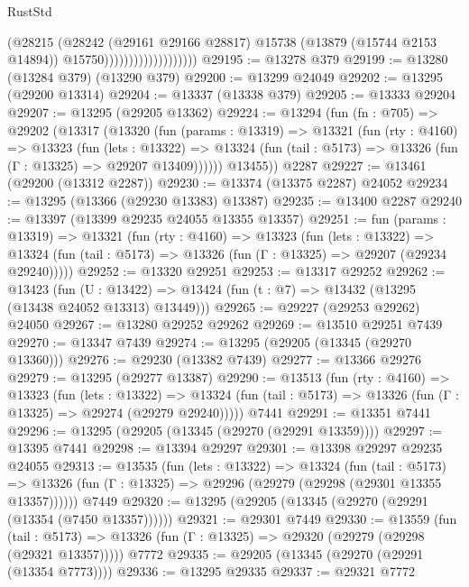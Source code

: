\begin{lexlean}{RustStd}
\begin{coremodule}
                                      (@28215
                                        (@28242
                                          (@29161 @29166 @28817)
                                          @15738
                                          (@13879 (@15744 @2153 @14894))
                                          @15750)))))))))))))))))))
@29195 := @13278 @379
@29199 := @13280 (@13284 @379) (@13290 @379)
@29200 := @13299 @24049
@29202 := @13295 (@29200 @13314)
@29204 := @13337 (@13338 @379)
@29205 := @13333 @29204
@29207 := @13295 (@29205 @13362)
@29224 := @13294
    (fun (fn : @705) =>
    @29202
      (@13317
        (@13320
          (fun (params : @13319) =>
          @13321
            (fun (rty : @4160) =>
            @13323
              (fun (lets : @13322) =>
              @13324 (fun (tail : @5173) => @13326 (fun (Γ : @13325) => @29207 @13409))))))
        @13455))
    @2287
@29227 := @13461 (@29200 (@13312 @2287))
@29230 := @13374 (@13375 @2287) @24052
@29234 := @13295 (@13366 (@29230 @13383) @13387)
@29235 := @13400 @2287
@29240 := @13397 (@13399 @29235 @24055 @13355 @13357)
@29251 := fun (params : @13319) =>
  @13321
    (fun (rty : @4160) =>
    @13323
      (fun (lets : @13322) =>
      @13324 (fun (tail : @5173) => @13326 (fun (Γ : @13325) => @29207 (@29234 @29240)))))
@29252 := @13320 @29251
@29253 := @13317 @29252
@29262 := @13423
    (fun (U : @13422) => @13424 (fun (t : @7) => @13432 (@13295 (@13438 @24052 @13313) @13449)))
@29265 := @29227 (@29253 @29262) @24050
@29267 := @13280 @29252 @29262
@29269 := @13510 @29251 @7439
@29270 := @13347 @7439
@29274 := @13295 (@29205 (@13345 (@29270 @13360)))
@29276 := @29230 (@13382 @7439)
@29277 := @13366 @29276
@29279 := @13295 (@29277 @13387)
@29290 := @13513
    (fun (rty : @4160) =>
    @13323
      (fun (lets : @13322) =>
      @13324 (fun (tail : @5173) => @13326 (fun (Γ : @13325) => @29274 (@29279 @29240)))))
    @7441
@29291 := @13351 @7441
@29296 := @13295 (@29205 (@13345 (@29270 (@29291 @13359))))
@29297 := @13395 @7441
@29298 := @13394 @29297
@29301 := @13398 @29297 @29235 @24055
@29313 := @13535
    (fun (lets : @13322) =>
    @13324
      (fun (tail : @5173) =>
      @13326 (fun (Γ : @13325) => @29296 (@29279 (@29298 (@29301 @13355 @13357))))))
    @7449
@29320 := @13295 (@29205 (@13345 (@29270 (@29291 (@13354 (@7450 @13357))))))
@29321 := @29301 @7449
@29330 := @13559
    (fun (tail : @5173) => @13326 (fun (Γ : @13325) => @29320 (@29279 (@29298 (@29321 @13357)))))
    @7772
@29335 := @29205 (@13345 (@29270 (@29291 (@13354 @7773))))
@29336 := @13295 @29335
@29337 := @29321 @7772

\end{coremodule}
\end{lexlean}
